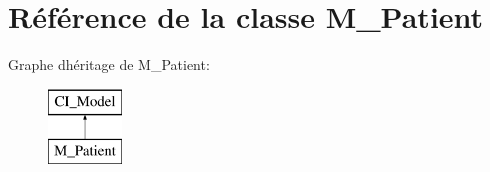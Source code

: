 \hypertarget{class_m___patient}{}\section{Référence de la classe M\+\_\+\+Patient}
\label{class_m___patient}
Graphe d\textquotesingle{}héritage de M\+\_\+\+Patient\+:\begin{figure}[H]
\begin{center}
\leavevmode
\includegraphics[height=2.000000cm]{class_m___patient}
\end{center}
\end{figure}
